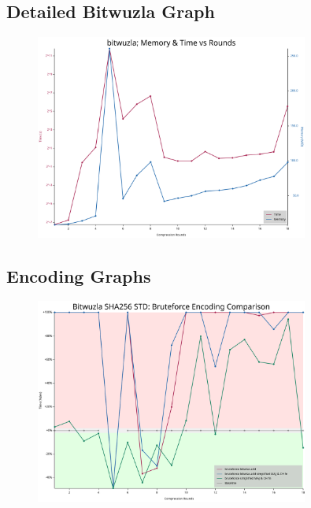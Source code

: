 \subsection{Detailed Bitwuzla Graph}

\begin{figure}[H]
	\centering
	\includegraphics[width=0.8\textwidth]{../../graphs/detailed_bitwuzla_SHA256_STD.svg}
\end{figure}

\subsection{Encoding Graphs}

\begin{figure}[H]
	\centering
	\includegraphics[width=0.8\textwidth]{../../graphs/bitwuzla_bruteforce_encoding_comparison.svg}
\end{figure}

